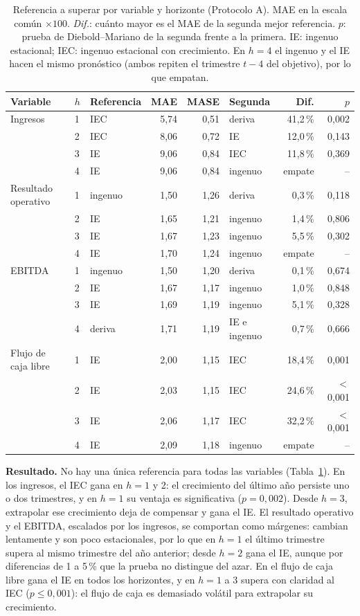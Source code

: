 \documentclass[12pt,letterpaper,oneside]{report}
\renewcommand{\_}{\UnderscoreOriginal\allowbreak}
\begin{document}
\begin{table}[H]
\centering
\caption{Referencia a superar por variable y horizonte (Protocolo A). MAE en la escala común $\times 100$. \emph{Dif.}: cuánto mayor es el MAE de la segunda mejor referencia. $p$: prueba de Diebold--Mariano de la segunda frente a la primera. IE: ingenuo estacional; IEC: ingenuo estacional con crecimiento. En $h = 4$ el ingenuo y el IE hacen el mismo pronóstico (ambos repiten el trimestre $t - 4$ del objetivo), por lo que empatan.}
\label{tab:referencia}
\small
\begin{tabular}{@{}lllrrlrr@{}}
\toprule
Variable & $h$ & Referencia & MAE & MASE & Segunda & Dif. & $p$ \\
\midrule
Ingresos & 1 & IEC & 5,74 & 0,51 & deriva & 41,2\,\% & 0,002 \\
 & 2 & IEC & 8,06 & 0,72 & IE & 12,0\,\% & 0,143 \\
 & 3 & IE & 9,06 & 0,84 & IEC & 11,8\,\% & 0,369 \\
 & 4 & IE & 9,06 & 0,84 & ingenuo & empate & -- \\
\addlinespace
Resultado operativo & 1 & ingenuo & 1,50 & 1,26 & deriva & 0,3\,\% & 0,118 \\
 & 2 & IE & 1,65 & 1,21 & ingenuo & 1,4\,\% & 0,806 \\
 & 3 & IE & 1,67 & 1,23 & ingenuo & 5,5\,\% & 0,302 \\
 & 4 & IE & 1,70 & 1,24 & ingenuo & empate & -- \\
\addlinespace
EBITDA & 1 & ingenuo & 1,50 & 1,20 & deriva & 0,1\,\% & 0,674 \\
 & 2 & IE & 1,67 & 1,17 & ingenuo & 1,0\,\% & 0,848 \\
 & 3 & IE & 1,69 & 1,19 & ingenuo & 5,1\,\% & 0,328 \\
 & 4 & deriva & 1,71 & 1,19 & IE e ingenuo & 0,7\,\% & 0,666 \\
\addlinespace
Flujo de caja libre & 1 & IE & 2,00 & 1,15 & IEC & 18,4\,\% & 0,001 \\
 & 2 & IE & 2,03 & 1,15 & IEC & 24,6\,\% & $<$0,001 \\
 & 3 & IE & 2,06 & 1,17 & IEC & 32,2\,\% & $<$0,001 \\
 & 4 & IE & 2,09 & 1,18 & ingenuo & empate & -- \\
\bottomrule
\end{tabular}
\end{table}

\textbf{Resultado.} No hay una única referencia para todas las variables (Tabla~\ref{tab:referencia}). En los ingresos, el IEC gana en $h = 1$ y 2: el crecimiento del último año persiste uno o dos trimestres, y en $h = 1$ su ventaja es significativa ($p = 0{,}002$). Desde $h = 3$, extrapolar ese crecimiento deja de compensar y gana el IE. El resultado operativo y el EBITDA, escalados por los ingresos, se comportan como márgenes: cambian lentamente y son poco estacionales, por lo que en $h = 1$ el último trimestre supera al mismo trimestre del año anterior; desde $h = 2$ gana el IE, aunque por diferencias de 1 a 5\,\% que la prueba no distingue del azar. En el flujo de caja libre gana el IE en todos los horizontes, y en $h = 1$ a 3 supera con claridad al IEC ($p \le 0{,}001$): el flujo de caja es demasiado volátil para extrapolar su crecimiento.
\end{document}

